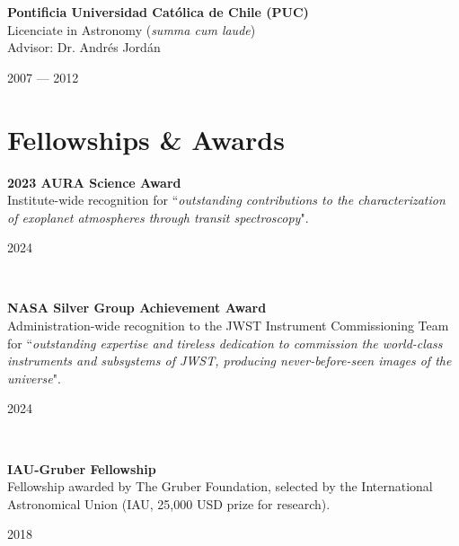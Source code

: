 \documentclass[12pt, a4paper]{article} %
\begin{document}
\begin{minipage}[t]{0.6\textwidth}
\begin{flushleft}%
  \setlength{\leftskip}{0.2cm}%
\textbf{Pontificia Universidad Cat\'olica de Chile (PUC)}\\
 Licenciate in Astronomy (\textit{summa cum laude})\\
 Advisor: Dr. Andr\'es Jord\'an
 \end{flushleft}
\end{minipage}
\begin{minipage}[t]{0.4\textwidth}
\hfill 2007 --- 2012 
\end{minipage}

\section*{Fellowships \& Awards}

\begin{minipage}[t]{0.7\textwidth}
\begin{flushleft}%
  \setlength{\leftskip}{0.2cm}%
\textbf{2023 AURA Science Award}\\
Institute-wide recognition for ``\textit{outstanding contributions to the characterization of exoplanet atmospheres through transit spectroscopy}".
\end{flushleft}
\end{minipage}
\begin{minipage}[t]{0.3\textwidth}
\hfill 2024
\end{minipage}\\

\begin{minipage}[t]{0.7\textwidth}
\begin{flushleft}%
  \setlength{\leftskip}{0.2cm}%
\textbf{NASA Silver Group Achievement Award}\\
Administration-wide recognition to the JWST Instrument Commissioning Team for ``\textit{outstanding expertise and tireless dedication to commission the world-class instruments and subsystems of JWST, producing never-before-seen images of the universe}".
\end{flushleft}
\end{minipage}
\begin{minipage}[t]{0.3\textwidth}
\hfill 2024
\end{minipage}\\

\begin{minipage}[t]{0.7\textwidth}
\begin{flushleft}%
  \setlength{\leftskip}{0.2cm}%
\textbf{IAU-Gruber Fellowship}\\
Fellowship awarded by The Gruber Foundation, selected by the International Astronomical Union (IAU, 25,000 USD prize for research).
\end{flushleft}
\end{minipage}
\begin{minipage}[t]{0.3\textwidth}
\hfill 2018
\end{minipage}\\
\end{document}

